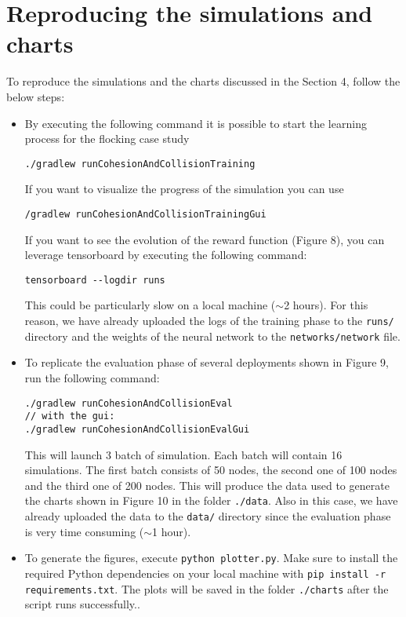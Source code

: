 \documentclass[runningheads]{llncs}
\begin{document}
\section{Reproducing the simulations and charts}
To reproduce the simulations and the charts discussed in the Section 4, follow the below steps:
\begin{itemize}
\item By executing the following command it is possible to start the learning process for the flocking case study \begin{lstlisting}
./gradlew runCohesionAndCollisionTraining
\end{lstlisting}
If you want to visualize the progress of the simulation you can use 
\begin{lstlisting}
/gradlew runCohesionAndCollisionTrainingGui 
\end{lstlisting}
If you want to see the evolution of the reward function (Figure 8), you can leverage tensorboard by executing the following command:
\begin{lstlisting}
tensorboard --logdir runs
\end{lstlisting}
This could be particularly slow on a local machine ($\sim$2 hours). For this reason, we have already uploaded the logs of the training phase to the \texttt{runs/} directory and the weights of the neural network to the \texttt{networks/network} file.
\item To replicate the evaluation phase of several deployments shown in Figure 9, run the following command:
\begin{lstlisting}
./gradlew runCohesionAndCollisionEval
// with the gui:
./gradlew runCohesionAndCollisionEvalGui
\end{lstlisting}
This will launch 3 batch of simulation. Each batch will contain 16 simulations. The first batch consists of 50 nodes, the second one of 100 nodes and the third one of 200 nodes. 
This will produce the data used to generate the charts shown in Figure 10 in the folder \texttt{./data}.
Also in this case, we have already uploaded the data to the \texttt{data/} directory since the evaluation phase is very time consuming ($\sim$1 hour).
\item To generate the figures, execute \texttt{python plotter.py}. Make sure to install the required Python dependencies on your local machine with \texttt{pip install -r requirements.txt}. The plots will be saved in the folder \texttt{./charts} after the script runs successfully..
\end{itemize}
\end{document}
